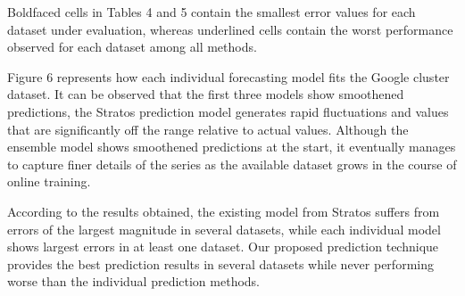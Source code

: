 Boldfaced cells in Tables 4 and 5 contain the smallest error values for each dataset under evaluation, whereas underlined cells contain the worst performance observed for each dataset among all methods.

Figure 6 represents how each individual forecasting model fits the Google cluster dataset. It can be observed that the first three models show smoothened predictions, the Stratos prediction model generates rapid fluctuations and values that are significantly off the range relative to actual values. Although the ensemble model shows smoothened predictions at the start, it eventually manages to capture finer details of the series as the available dataset grows in the course of online training.

According to the results obtained, the existing model from Stratos suffers from errors of the largest magnitude in several datasets, while each individual model shows largest errors in at least one dataset. Our proposed prediction technique provides the best prediction results in several datasets while never performing worse than the individual prediction methods.